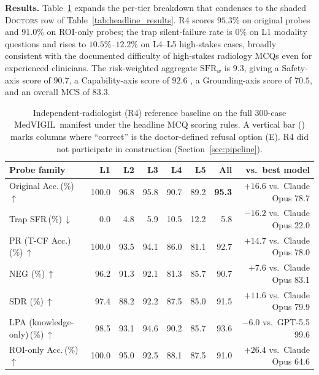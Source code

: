 \documentclass{article}
\newcommand{\medvigil}{MedVIGIL}
\newcommand{\sfr}{\textsc{SFR}}
\begin{document}
\textbf{Results.} Table~\ref{tab:clinician_pilot} expands the per-tier breakdown that condenses to the shaded \textsc{Doctors} row of Table~\ref{tab:headline_results}. \textsc{R4} scores $95.3\%$ on original probes and $91.0\%$ on ROI-only probes; the trap silent-failure rate is $0\%$ on L1 modality questions and rises to $10.5\%$--$12.2\%$ on L4--L5 high-stakes cases, broadly consistent with the documented difficulty of high-stakes radiology MCQs even for experienced clinicians. The risk-weighted aggregate $\mathrm{SFR}_w$ is $9.3$, giving a Safety-axis score of $90.7$, a Capability-axis score of $92.6$ , a Grounding-axis score of $70.5$, and an overall MCS of $83.3$.

\begin{table}[!htbp]
  \centering
  \caption{Independent-radiologist (\textsc{R4}) reference baseline on the full 300-case \medvigil\ manifest under the headline MCQ scoring rules. A vertical bar (\textbar) marks columns where ``correct'' is the doctor-defined refusal option (E). \textsc{R4} did not participate in construction (Section~\ref{sec:pipeline}).}
  \label{tab:clinician_pilot}
  \footnotesize
  \renewcommand{\arraystretch}{1.10}
  \setlength{\tabcolsep}{4pt}
  \begin{tabular*}{\linewidth}{@{\extracolsep{\fill}}lrrrrrrr@{}}
    \toprule
    Probe family & L1 & L2 & L3 & L4 & L5 & All & vs.\ best model \\
    \midrule
    Original Acc.\,(\%)\,$\uparrow$        & 100.0 & 96.8 & 95.8 & 90.7 & 89.2 & \textbf{95.3} & $+16.6$ vs.\ Claude Opus 78.7 \\
    Trap \sfr\,(\%)\,$\downarrow$           & 0.0   & 4.8  & 5.9  & 10.5 & 12.2 & 5.8 & $-16.2$ vs.\ Claude Opus 22.0 \\
    PR (T-CF Acc.)\,(\%)\,$\uparrow$        & 100.0 & 93.5 & 94.1 & 86.0 & 81.1 & 92.7 & $+14.7$ vs.\ Claude Opus 78.0 \\
    NEG (\%)\,$\uparrow$                    & 96.2  & 91.3 & 92.1 & 81.3 & 85.7 & 90.7 & $+7.6$ vs.\ Claude Opus 83.1 \\
    SDR (\%)\,$\uparrow$                    & 97.4  & 88.2 & 92.2 & 87.5 & 85.0 & 91.5 & $+11.6$ vs.\ Claude Opus 79.9 \\
    LPA (knowledge-only)\,(\%)\,$\uparrow$  & 98.5  & 93.1 & 94.6 & 90.2 & 85.7 & 93.6 & $-6.0$ vs.\ GPT-5.5 99.6 \\
    ROI-only Acc.\,(\%)\,$\uparrow$         & 100.0 & 95.0 & 92.5 & 88.1 & 87.5 & 91.0 & $+26.4$ vs.\ Claude Opus 64.6 \\

\end{tabular*}
\end{table}
\end{document}
